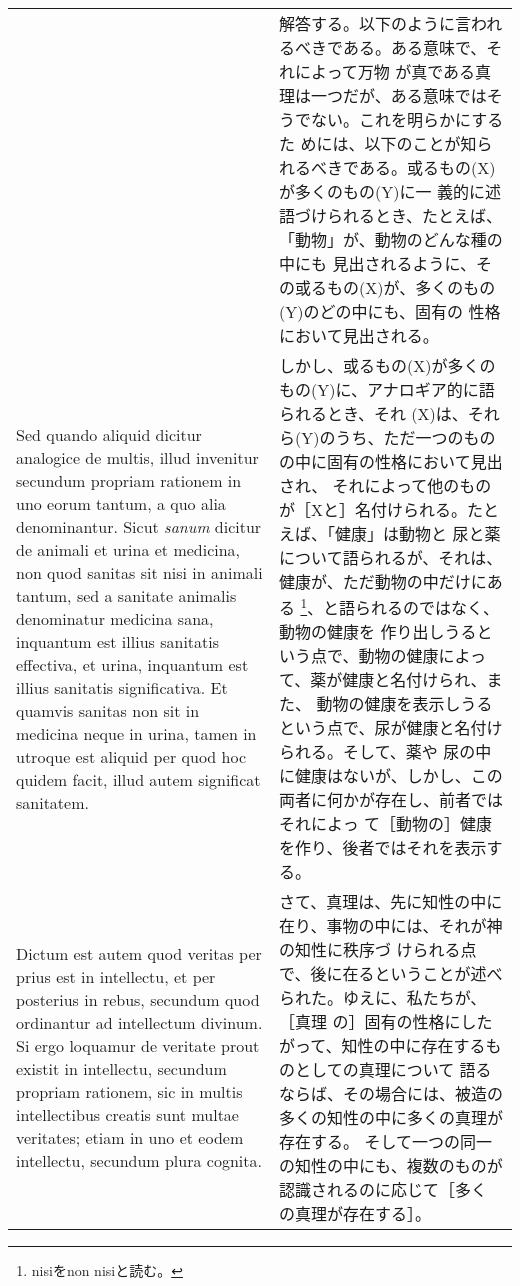 \documentclass[10pt]{jsarticle} %
\begin{document}
\begin{longtable}{p{21em}p{21em}}
&

解答する。以下のように言われるべきである。ある意味で、それによって万物
が真である真理は一つだが、ある意味ではそうでない。これを明らかにするた
めには、以下のことが知られるべきである。或るもの(X)が多くのもの(Y)に一
義的に述語づけられるとき、たとえば、「動物」が、動物のどんな種の中にも
見出されるように、その或るもの(X)が、多くのもの(Y)のどの中にも、固有の
性格において見出される。

\\

Sed quando aliquid dicitur analogice de multis, illud invenitur
secundum propriam rationem in uno eorum tantum, a quo alia
denominantur. Sicut {\itshape sanum} dicitur de animali et urina et
medicina, non quod sanitas sit nisi in animali tantum, sed a sanitate
animalis denominatur medicina sana, inquantum est illius sanitatis
effectiva, et urina, inquantum est illius sanitatis significativa. Et
quamvis sanitas non sit in medicina neque in urina, tamen in utroque
est aliquid per quod hoc quidem facit, illud autem significat
sanitatem.

 &

しかし、或るもの(X)が多くのもの(Y)に、アナロギア的に語られるとき、それ
(X)は、それら(Y)のうち、ただ一つのものの中に固有の性格において見出され、
それによって他のものが［Xと］名付けられる。たとえば、「健康」は動物と
尿と薬について語られるが、それは、健康が、ただ動物の中だけにある
\footnote{nisiをnon nisiと読む。}、と語られるのではなく、動物の健康を
作り出しうるという点で、動物の健康によって、薬が健康と名付けられ、また、
動物の健康を表示しうるという点で、尿が健康と名付けられる。そして、薬や
尿の中に健康はないが、しかし、この両者に何かが存在し、前者ではそれによっ
て［動物の］健康を作り、後者ではそれを表示する。

\\

Dictum est autem quod veritas per prius est in intellectu, et per
posterius in rebus, secundum quod ordinantur ad intellectum
divinum. Si ergo loquamur de veritate prout existit in intellectu,
secundum propriam rationem, sic in multis intellectibus creatis sunt
multae veritates; etiam in uno et eodem intellectu, secundum plura
cognita.

&

さて、真理は、先に知性の中に在り、事物の中には、それが神の知性に秩序づ
けられる点で、後に在るということが述べられた。ゆえに、私たちが、［真理
の］固有の性格にしたがって、知性の中に存在するものとしての真理について
語るならば、その場合には、被造の多くの知性の中に多くの真理が存在する。
そして一つの同一の知性の中にも、複数のものが認識されるのに応じて［多く
の真理が存在する］。


\end{longtable}
\end{document}
